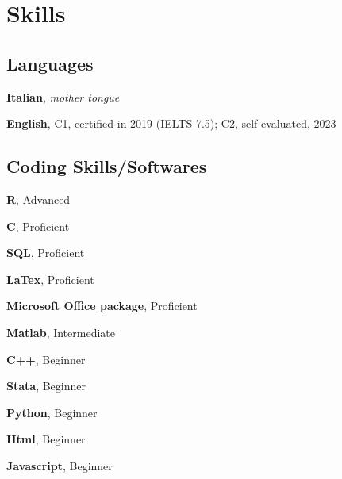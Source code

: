 \documentclass[8pt,]{article}
\providecommand{\tightlist}{%
  \setlength{\itemsep}{0pt}\setlength{\parskip}{0pt}}
\renewenvironment{itemize}{
  \begin{list}{}{
    \setlength{\leftmargin}{1.5em}
  }
}{
  \end{list}
}
\begin{document}
\hypertarget{skills}{%
\section{Skills}\label{skills}}

\hypertarget{languages}{%
\subsection{Languages}\label{languages}}

\begin{itemize}
\tightlist
\item
  \textbf{Italian}, \emph{mother tongue}
\item
  \textbf{English}, C1, certified in 2019 (IELTS 7.5); C2,
  self-evaluated, 2023
\end{itemize}

\hypertarget{coding-skillssoftwares}{%
\subsection{Coding Skills/Softwares}\label{coding-skillssoftwares}}

\begin{itemize}
\tightlist
\item
  \textbf{R}, Advanced
\item
  \textbf{C}, Proficient
\item
  \textbf{SQL}, Proficient
\item
  \textbf{LaTex}, Proficient
\item
  \textbf{Microsoft Office package}, Proficient
\item
  \textbf{Matlab}, Intermediate
\item
  \textbf{C++}, Beginner
\item
  \textbf{Stata}, Beginner
\item
  \textbf{Python}, Beginner
\item
  \textbf{Html}, Beginner
\item
  \textbf{Javascript}, Beginner
\end{itemize}
\end{document}
